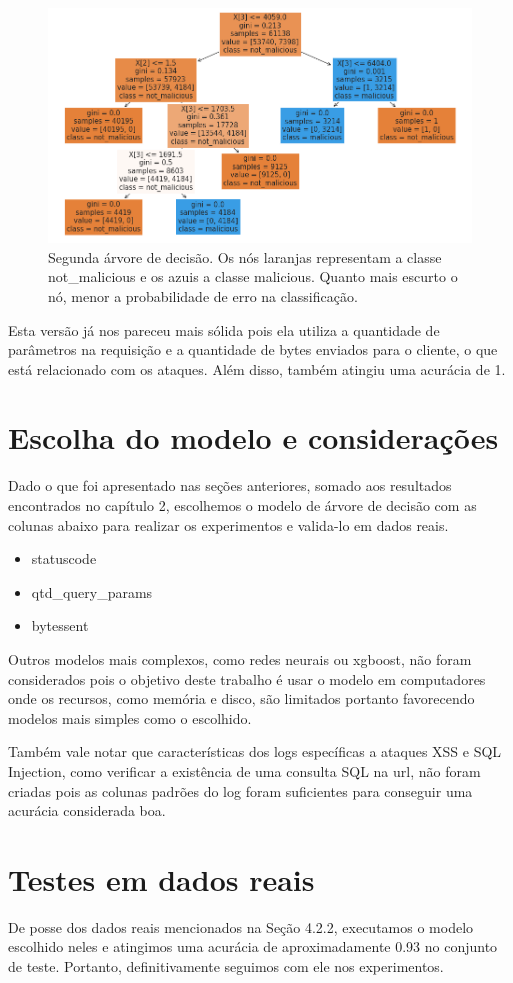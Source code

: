 \begin{figure}
    \centering
    \includegraphics[width=.9\textwidth]{figuras/segunda_arvore.png}
    \caption{Segunda árvore de decisão. Os nós laranjas representam a classe not\_malicious 
    e os azuis a classe malicious. Quanto mais escurto o nó, menor a probabilidade de erro 
    na classificação. \label{fig:segunda_arvore}}    
\end{figure}

Esta versão já nos pareceu mais sólida pois ela utiliza a quantidade de parâmetros na requisição 
e a quantidade de bytes enviados para o cliente, o que está relacionado com os ataques. Além disso,
também atingiu uma acurácia de 1.

\section{Escolha do modelo e considerações}

Dado o que foi apresentado nas seções anteriores, somado aos resultados encontrados no capítulo 2, escolhemos o modelo de árvore de decisão com as colunas
abaixo para realizar os experimentos e valida-lo em dados reais. 

\begin{itemize}
    \item statuscode
    \item qtd\_query\_params
    \item bytessent
\end{itemize}

Outros modelos mais complexos, como redes neurais ou xgboost, não foram considerados pois o 
objetivo deste trabalho é usar o modelo em computadores onde os recursos, como memória e 
disco, são limitados portanto favorecendo modelos mais simples como o escolhido.

Também vale notar que características dos logs específicas a ataques XSS e SQL Injection, como 
verificar a existência de uma consulta SQL na url, não foram criadas pois as colunas padrões 
do log foram suficientes para conseguir uma acurácia considerada boa.

\section{Testes em dados reais}

De posse dos dados reais mencionados na Seção 4.2.2, executamos o modelo escolhido neles e atingimos 
uma acurácia de aproximadamente 0.93 no conjunto de teste. Portanto, definitivamente
seguimos com ele nos experimentos.
